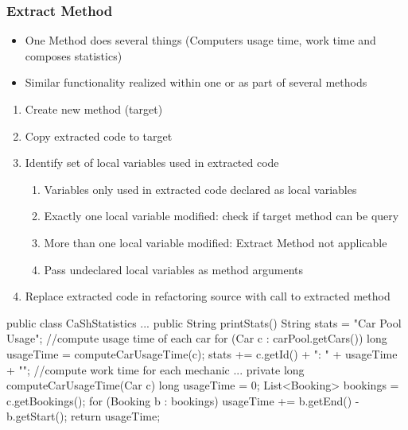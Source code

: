 \subsubsection*{Extract Method}
\begin{defBox}[title=When to Use?]
    \begin{itemize}
        \item One Method does several things (Computers usage time, work time and composes statistics)
        \item Similar functionality realized within one or as part of several methods
    \end{itemize}
\end{defBox}
\begin{defBox}[title=Extract Method]
    \begin{enumerate}
        \item Create new method (target)
        \item Copy extracted code to target
        \item Identify set of local variables used in extracted code
        \begin{enumerate}
            \item Variables only used in extracted code declared as local variables
            \item Exactly one local variable modified: check if target method can be query
            \item More than one local variable modified: Extract Method not applicable
            \item Pass undeclared local variables as method arguments
        \end{enumerate}
        \item Replace extracted code in refactoring source with call to extracted method
    \end{enumerate}
\end{defBox}
\begin{codeBlock}{}
    public class CaShStatistics{
        ...
        public String printStats(){
            String stats = "Car Pool Usage\n";
            //compute usage time of each car
            for (Car c : carPool.getCars()){
                long usageTime = computeCarUsageTime(c);
                stats += c.getId() + ": " + usageTime + "\n";
            }
            //compute work time for each mechanic
            ...
        }
        private long computeCarUsageTime(Car c){
            long usageTime = 0;
            List<Booking> bookings = c.getBookings();
            for (Booking b : bookings){
                usageTime += b.getEnd() - b.getStart();
            }
            return usageTime;
        }
    }
\end{codeBlock}
